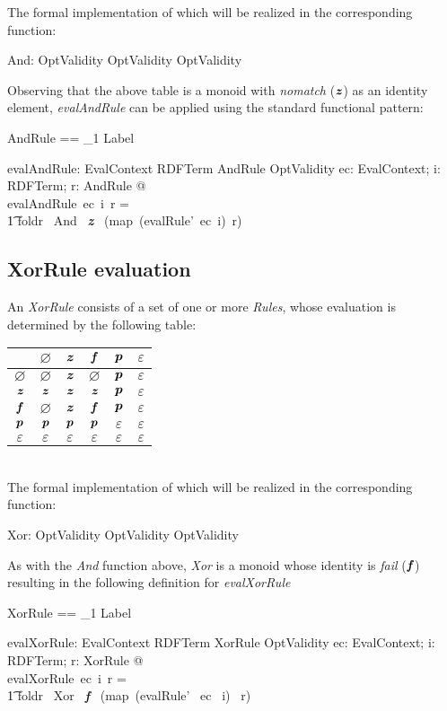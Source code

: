 \documentclass[fuzz]{llncs}
\def\pass{\textbf{\textit{p}}}
\def\fail{\textbf{\textit{f}}}
\def\dunno{\varnothing}
\def\error{\varepsilon}
\def\nomatch{\textbf{\textit{z}}}
\def\zc{\textit}
\def\zcb{\textit{\textbf}}
\begin{document}
The formal implementation of which will be realized in the corresponding function:
\begin{gendef}
   And: OptValidity \fun OptValidity \fun OptValidity
\end{gendef}

Observing that the above table is a monoid with \zc{nomatch} ($\nomatch$) as an identity
element, \zc{evalAndRule} can be applied using the standard functional pattern:
\begin{zed}
AndRule == \seq_1 Label
\end{zed}
\begin{gendef}
   evalAndRule: EvalContext \fun RDFTerm \fun AndRule \fun OptValidity
\where
   \forall ec: EvalContext; i: RDFTerm; r: AndRule  @ \\
	evalAndRule~ec~i~r = \\
\t1	foldr~ And~ \nomatch ~ (map~(evalRule'~ec~i)~r)
\end{gendef}

\subsection{XorRule evaluation}
An \zc{XorRule} consists of a set of one or more \zc{Rules}, whose evaluation is determined
by the following table: \\

\begin{tabular}{c || c | c | c | c | c |}
   \hline
   \zcb{Xor} & $\dunno$ & $\nomatch$ & $\fail$ & $\pass$ & $\error$ \\
   \hline \hline
   $\dunno$ & $\dunno$ & $\nomatch$ & $\dunno$ & $\pass$ & $\error$ \\ \hline
   $\nomatch$ & $\nomatch$ & $\nomatch$ & $\nomatch$ & $\pass$ & $\error$ \\ \hline
   $\fail$ & $\dunno$ & $\nomatch$ & $\fail$ & $\pass$ & $\error$ \\ \hline
   $\pass$ & $\pass$ & $\pass$ & $\pass$ & $\error$ & $\error$ \\ \hline
   $\error$ & $\error$ & $\error$ & $\error$ & $\error$ & $\error$ \\ \hline 
\end{tabular}
\\
The formal implementation of which will be realized in the corresponding function:
\begin{gendef}
   Xor: OptValidity \fun OptValidity \fun OptValidity
\end{gendef}
As with the \zc{And} function above, \zc{Xor} is a monoid whose identity is \zc{fail} ($\fail$)
resulting in the following definition for \zc{evalXorRule}
\begin{zed}
XorRule == \seq_1 Label
\end{zed}
\begin{gendef}
   evalXorRule: EvalContext \fun RDFTerm \fun XorRule \fun OptValidity
\where
   \forall ec: EvalContext; i: RDFTerm; r: XorRule  @ \\
	evalXorRule~ec~i~r = \\
\t1	foldr~ Xor~ \fail ~ (map~(evalRule'~ ec ~i)~ r)
\end{gendef}
\end{document}
